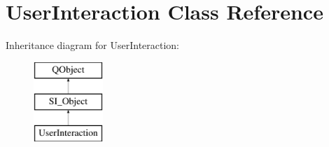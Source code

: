 \hypertarget{class_user_interaction}{}\section{User\+Interaction Class Reference}
\label{class_user_interaction}
Inheritance diagram for User\+Interaction\+:\begin{figure}[H]
\begin{center}
\leavevmode
\includegraphics[height=3.000000cm]{class_user_interaction}
\end{center}
\end{figure}
